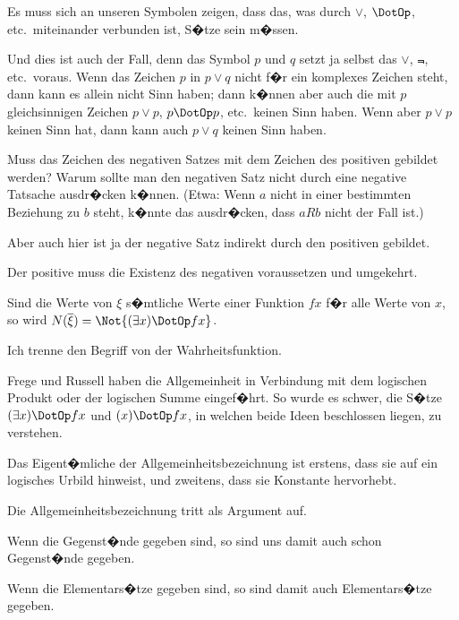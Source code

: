 {Es muss sich an unseren Symbolen zeigen, dass
das, was durch \glqq{}$\lor$\grqq{}, \glqq{}$\DotOp$\grqq{}, etc.\ miteinander verbunden
ist, S�tze sein m�ssen.

Und dies ist auch der Fall, denn das Symbol \glqq{}$p$\grqq{}
und \glqq{}$q$\grqq{} setzt ja selbst das \glqq{}$\lor$\grqq{}, \glqq{}$\Not{}$\grqq{}, etc.\ voraus.
Wenn das Zeichen \glqq{}$p$\grqq{} in \glqq{}$p \lor q$\grqq{} nicht f�r ein komplexes
Zeichen steht, dann kann es allein nicht
Sinn haben; dann k�nnen aber auch die mit \glqq{}$p$\grqq{}
gleichsinnigen Zeichen \glqq{}$p \lor p$\grqq{}, \glqq{}$p \DotOp p$\grqq{}, etc.\ keinen
Sinn haben. Wenn aber \glqq{}$p \lor p$\grqq{} keinen Sinn hat,
dann kann auch \glqq{}$p \lor q$\grqq{} keinen Sinn haben.}


{Muss das Zeichen des negativen Satzes mit dem
Zeichen des positiven gebildet werden? Warum
sollte man den negativen Satz nicht durch eine negative
Tatsache ausdr�cken k�nnen. (Etwa: Wenn
\glqq{}$a$\grqq{} nicht in einer bestimmten Beziehung zu \glqq{}$b$\grqq{} steht,
k�nnte das ausdr�cken, dass $aRb$ nicht der Fall ist.)

Aber auch hier ist ja der negative Satz indirekt
durch den positiven gebildet.

Der positive  muss die Existenz des negativen
 voraussetzen und umgekehrt.}


{Sind die Werte von $\xi$ s�mtliche Werte einer
Funktion $fx$ f�r alle Werte von $x$, so wird
$N(\overline{\xi}) = \Not{(\exists x) \DotOp fx}$.}


{Ich trenne den Begriff  von der Wahrheitsfunktion.

Frege und Russell haben die Allgemeinheit in
Verbindung mit dem logischen Produkt oder der
logischen Summe eingef�hrt. So wurde es schwer,
die S�tze \glqq{}$(\exists x) \DotOp fx$\grqq{} und \glqq{}$(x) \DotOp fx$\grqq{}, in welchen beide
Ideen beschlossen liegen, zu verstehen.}


{Das Eigent�mliche der Allgemeinheitsbezeichnung
ist erstens, dass sie auf ein logisches Urbild
hinweist, und zweitens, dass sie Konstante
hervorhebt.}


{Die Allgemeinheitsbezeichnung tritt als Argument
auf.}


{Wenn die Gegenst�nde gegeben sind, so sind
uns damit auch schon  Gegenst�nde gegeben.

Wenn die Elementars�tze gegeben sind, so sind
damit auch  Elementars�tze gegeben.}


